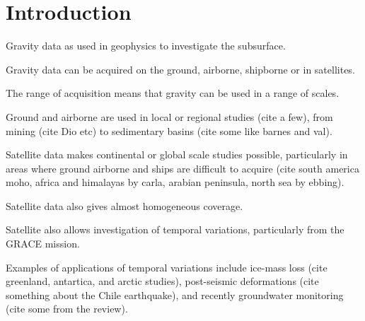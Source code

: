 \chapter{Introduction}


Gravity data as used in geophysics to investigate the subsurface.

Gravity data can be acquired on the ground, airborne, shipborne or in satellites.

The range of acquisition means that gravity can be used in a range of scales.

Ground and airborne are used in local or regional studies (cite a few), from
mining (cite Dio etc) to sedimentary basins (cite some like barnes and val).

Satellite data makes continental or global scale studies possible, particularly
in areas where ground airborne and ships are difficult to acquire (cite south
america moho, africa and himalayas by carla, arabian peninsula, north sea
by ebbing).

Satellite data also gives almost homogeneous coverage.

Satellite also allows investigation of temporal variations, particularly from
the GRACE mission.

Examples of applications of temporal variations include ice-mass loss (cite
greenland, antartica, and arctic studies), post-seismic deformations (cite
something about the Chile earthquake), and recently groundwater monitoring
(cite some from the review).
